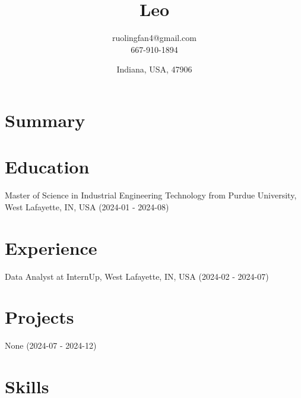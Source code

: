 \documentclass{article}%
\title{Leo}%
\author{ruolingfan4@gmail.com \\ 667-910-1894}%
\date{Indiana, USA, 47906}%
\begin{document}
%
\normalsize%
\maketitle%
\section{Summary}%
\label{sec:Summary}%

%
\section{Education}%
\label{sec:Education}%
Master of Science in Industrial Engineering Technology from Purdue University, West Lafayette, IN, USA (2024{-}01 {-} 2024{-}08)

%
\section{Experience}%
\label{sec:Experience}%
Data Analyst at InternUp, West Lafayette, IN, USA (2024{-}02 {-} 2024{-}07)

%
\section{Projects}%
\label{sec:Projects}%
None (2024{-}07 {-} 2024{-}12)

%
\section{Skills}%
\label{sec:Skills}%

%
\end{document}
